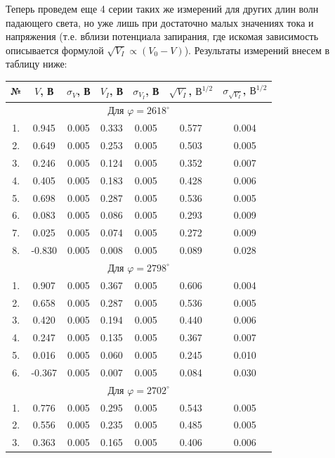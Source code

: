 \documentclass[a4paper,12pt]{extarticle}
\begin{document}
Теперь проведем еще 4 серии таких же измерений для других длин волн падающего света, но уже лишь при достаточно малых значениях тока и напряжения (т.е. вблизи потенциала запирания, где искомая зависимость описывается формулой $\sqrt{V_I} \propto (V_0 - V)$). Результаты измерений внесем в таблицу ниже:
\begin{table}[H]
	\begin{center}
		\begin{tabular}{|c|c|c|c|c|c|c|}
			\hline
			№ & $V$, В & $\sigma_V$, В & $V_I$, В & $\sigma_{V_I}$, В & $ \sqrt{V_I}$, $\text{В}^{1/2}$ & $\sigma_{\sqrt{V_I}}$, $\text{В}^{1/2}$ \\
			\hline
			\multicolumn{7}{|c|}{Для $\varphi = 2618^\circ$} \\
			\hline
			1. & 0.945 & 0.005 & 0.333 & 0.005 & 0.577 & 0.004 \\
			2. & 0.649 & 0.005 & 0.253 & 0.005 & 0.503 & 0.005 \\
			3. & 0.246 & 0.005 & 0.124 & 0.005 & 0.352 & 0.007 \\
			4. & 0.405 & 0.005 & 0.183 & 0.005 & 0.428 & 0.006 \\
			5. & 0.698 & 0.005 & 0.287 & 0.005 & 0.536 & 0.005 \\
			6. & 0.083 & 0.005 & 0.086 & 0.005 & 0.293 & 0.009 \\
			7. & 0.025 & 0.005 & 0.074 & 0.005 & 0.272 & 0.009 \\
			8. & -0.830 & 0.005 & 0.008 & 0.005 & 0.089 & 0.028 \\
			\hline 
			\multicolumn{7}{|c|}{Для $\varphi = 2798^\circ$} \\
			\hline
			1. & 0.907 & 0.005 & 0.367 & 0.005 & 0.606 & 0.004 \\
			2. & 0.658 & 0.005 & 0.287 & 0.005 & 0.536 & 0.005 \\
			3. & 0.420 & 0.005 & 0.194 & 0.005 & 0.440 & 0.006 \\
			4. & 0.247 & 0.005 & 0.135 & 0.005 & 0.367 & 0.007 \\
			5. & 0.016 & 0.005 & 0.060 & 0.005 & 0.245 & 0.010 \\
			6. & -0.367 & 0.005 & 0.007 & 0.005 & 0.084 & 0.030 \\
			\hline 
			\multicolumn{7}{|c|}{Для $\varphi = 2702^\circ$} \\
			\hline
			1. & 0.776 & 0.005 & 0.295 & 0.005 & 0.543 & 0.005 \\
			2. & 0.556 & 0.005 & 0.235 & 0.005 & 0.485 & 0.005 \\
			3. & 0.363 & 0.005 & 0.165 & 0.005 & 0.406 & 0.006 \\

\end{tabular}
\end{center}
\end{table}
\end{document}
